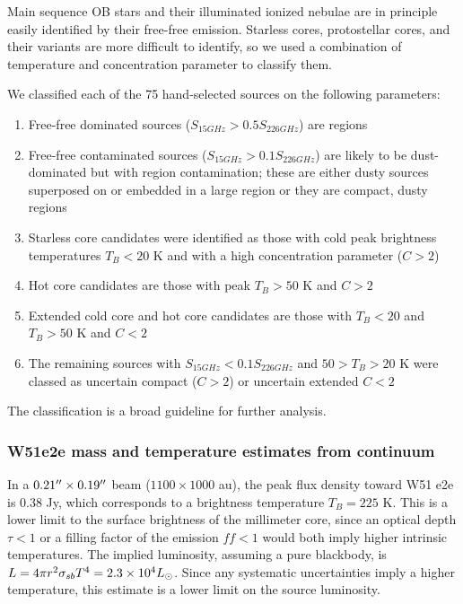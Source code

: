 \documentclass{aa}
\begin{document}
Main sequence OB stars and their illuminated ionized nebulae are in principle
easily identified by their free-free emission.  Starless cores, protostellar
cores, and their variants are more difficult to identify, so we used a combination
of temperature and concentration parameter to classify them.

We classified each of the 75 hand-selected sources on the following parameters:
\begin{enumerate}
    \item Free-free dominated sources ($S_{15 GHz} > 0.5 S_{226 GHz}$) are \hii
        regions
    \item Free-free contaminated sources ($S_{15 GHz} > 0.1 S_{226 GHz}$) are
        likely to be dust-dominated but with \hii region contamination; these
        are either dusty sources superposed on or embedded in a large \hii
        region or they are compact, dusty \hii regions
    \item Starless core candidates were identified as those with cold peak
        brightness temperatures $T_B < 20$ K and with a high concentration
        parameter ($C>2$)
    \item Hot core candidates are those with peak $T_B>50$ K and $C>2$
    \item Extended cold core and hot core candidates are those with $T_B<20$ 
        and $T_B>50$ K and $C<2$
    \item The remaining sources with $S_{15 GHz} < 0.1 S_{226 GHz}$ and $50 >
        T_B > 20$ K were classed as uncertain compact ($C>2$) or uncertain extended
        $C<2$
\end{enumerate}

The classification is a broad guideline for further analysis.   









\subsubsection{W51e2e mass and temperature estimates from continuum}
\label{sec:W51e2e}

In a $0.21\mbox{$^{\prime\prime}$}\times0.19\mbox{$^{\prime\prime}$}$ beam ($1100\times1000$ au), the peak flux
density toward W51 e2e is 0.38 Jy, which corresponds to a brightness
temperature $T_B=225$ K.  This is a lower limit to the surface brightness of
the millimeter core, since an optical depth $\tau<1$ or a filling factor of the
emission $ff<1$ would both imply higher intrinsic temperatures.  The implied
luminosity, assuming a pure blackbody, is $L = 4\pi r^2 \sigma_{sb} T^4 =
2.3\times10^{4} L_{\odot}$.  Since any systematic uncertainties imply a higher
temperature, this estimate is a lower limit on the source luminosity.
\end{document}
